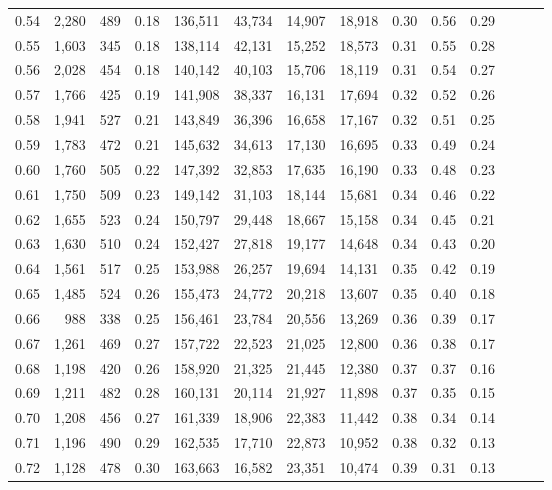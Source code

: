 \begin{tabular}{rrrrrrrrrrrrrr}
0.54 &  2,280 &  489 &  0.18 &  136,511 &   43,734 &  14,907 &  18,918 &  0.30 &  0.56 &      0.29 \\
0.55 &  1,603 &  345 &  0.18 &  138,114 &   42,131 &  15,252 &  18,573 &  0.31 &  0.55 &      0.28 \\
0.56 &  2,028 &  454 &  0.18 &  140,142 &   40,103 &  15,706 &  18,119 &  0.31 &  0.54 &      0.27 \\
0.57 &  1,766 &  425 &  0.19 &  141,908 &   38,337 &  16,131 &  17,694 &  0.32 &  0.52 &      0.26 \\
0.58 &  1,941 &  527 &  0.21 &  143,849 &   36,396 &  16,658 &  17,167 &  0.32 &  0.51 &      0.25 \\
0.59 &  1,783 &  472 &  0.21 &  145,632 &   34,613 &  17,130 &  16,695 &  0.33 &  0.49 &      0.24 \\
0.60 &  1,760 &  505 &  0.22 &  147,392 &   32,853 &  17,635 &  16,190 &  0.33 &  0.48 &      0.23 \\
0.61 &  1,750 &  509 &  0.23 &  149,142 &   31,103 &  18,144 &  15,681 &  0.34 &  0.46 &      0.22 \\
0.62 &  1,655 &  523 &  0.24 &  150,797 &   29,448 &  18,667 &  15,158 &  0.34 &  0.45 &      0.21 \\
0.63 &  1,630 &  510 &  0.24 &  152,427 &   27,818 &  19,177 &  14,648 &  0.34 &  0.43 &      0.20 \\
0.64 &  1,561 &  517 &  0.25 &  153,988 &   26,257 &  19,694 &  14,131 &  0.35 &  0.42 &      0.19 \\
0.65 &  1,485 &  524 &  0.26 &  155,473 &   24,772 &  20,218 &  13,607 &  0.35 &  0.40 &      0.18 \\
0.66 &    988 &  338 &  0.25 &  156,461 &   23,784 &  20,556 &  13,269 &  0.36 &  0.39 &      0.17 \\
0.67 &  1,261 &  469 &  0.27 &  157,722 &   22,523 &  21,025 &  12,800 &  0.36 &  0.38 &      0.17 \\
0.68 &  1,198 &  420 &  0.26 &  158,920 &   21,325 &  21,445 &  12,380 &  0.37 &  0.37 &      0.16 \\
0.69 &  1,211 &  482 &  0.28 &  160,131 &   20,114 &  21,927 &  11,898 &  0.37 &  0.35 &      0.15 \\
0.70 &  1,208 &  456 &  0.27 &  161,339 &   18,906 &  22,383 &  11,442 &  0.38 &  0.34 &      0.14 \\
0.71 &  1,196 &  490 &  0.29 &  162,535 &   17,710 &  22,873 &  10,952 &  0.38 &  0.32 &      0.13 \\
0.72 &  1,128 &  478 &  0.30 &  163,663 &   16,582 &  23,351 &  10,474 &  0.39 &  0.31 &      0.13 \\

\end{tabular}
